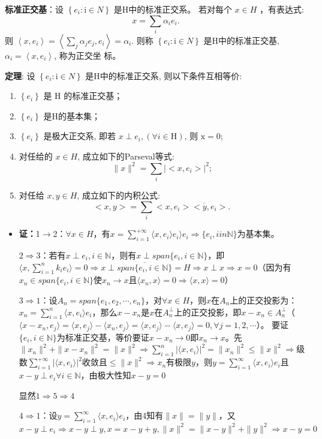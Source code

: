 \documentclass[12pt,a4paper]{article}
\begin{document}
\textbf{标准正交基}：设 $\left\{e_{i}: \mathrm{i} \in N\right\}$ 是H中的标准正交系。
若对每个 $x \in H$ ，有表达式:
$$
x=\sum_{i} \alpha_{i} e_{i} .
$$
则 $\left< x, e_{i}\right>=\left<\sum_{j} \alpha_{j} e_{j}, e_{i}\right>=\alpha_{i}$.
则称 $\left\{e_{i}: \mathrm{i} \in N\right\}$ 是H中的标准正交基, $\alpha_{i}=\left\langle x, e_{i}\right\rangle$, 称为正交坐 标。

\textbf{定理}: 设 $\left\{e_{i}: \mathrm{i} \in N\right\}$ 是H中的标准正交系, 则以下条件互相等价:
\begin{enumerate}
	\item $\left\{e_{i}\right\}$ 是 $\mathrm{H}$ 的标准正交基；
	\item $\left\{e_{i}\right\}$ 是H的基本集；
	\item $\left\{e_{i}\right\}$ 是极大正交系, 即若 $x \perp e_{i},(\forall i \in \mathrm{H})$, 则 $\mathrm{x}=0$;
	\item 对任给的 $x \in H$, 成立如下的Parseval等式:
$$
\|x\|^{2}=\sum_{i}\left|<x, e_{i}>\right|^{2} \text {; }
$$
\item 对任给 $x, y \in H$, 成立如下的内积公式:
$$
<x, y>=\sum_{i}<x, e_{i}>\overline{<y, e_{i}}>\text {. }
$$
\end{enumerate}
\begin{itemize}
	\item []
	\textbf{证：}1$\rightarrow$2：$\forall x\in H$，有$x=\sum_{i=1}^{+\infty}\langle x,e_i\rangle e_i \rangle e_i\Rightarrow \{e_i,i
	in \mathbb{N}\}$为基本集。
	
	$2\Rightarrow 3$：若有$x\perp e_i,i\in \mathbb{N}$，则有$x\perp span\{e_i,i \in \mathbb{N}\}$，即$\langle x,\sum_{i=1}^{n}k_ie_i\rangle =0\Rightarrow x\perp\overline{span\{e_i,i\in \mathbb{N}\}}=H\Rightarrow x\perp x\Rightarrow x=0$（因为有$x_n\in span\{e_i,i\in \mathbb{N}\}$使$x_n\rightarrow x$且$\langle x_n,x\rangle=0\Rightarrow\langle x,x\rangle=0$）
	
	$3\Rightarrow 1$：设$A_n=span\{e_1,e_2,\cdots,e_n\}$，对$\forall x\in H$，则$x$在$A_n$上的正交投影为：$x_n=\sum_{i=1}^n\langle x,e_i\rangle e_i$，那么$x-x_n$是$x$在$A_n^{\perp}$上的正交投影，即$x-x_n\in A_n^{\perp}$（$\langle x-x_n,e_j\rangle=\langle x,e_j\rangle -\langle x_n,e_j\rangle =\langle x,e_j\rangle-\langle x,e_j\rangle=0,\forall j=1,2,\cdots$）。
	要证$\{e_i,i\in \mathbb{N}\}$为标准正交基，等价要证$x-x_n\rightarrow 0$即$x_n\rightarrow x$。先$\|x_n\|^2+\|x-x_n\|^2=\|x\|^2\Rightarrow \sum_{i=1}^{n}|\langle x,e_i\rangle|^2=\|x_n\|^2\leqslant \|x\|^2\Rightarrow$级数$\sum_{i=1}^{+\infty}|\langle x,e_i\rangle|^2$收敛且$\leqslant\|x\|^2\Rightarrow x_n$有极限$y$，则$y=\sum_{i=1}^{\infty}\langle x,e_i\rangle e_i$且$x-y\perp e_i\forall i\in \mathbb{N}$，由极大性知$x-y=0$
	
	显然$1\Rightarrow 5\Rightarrow 4$
	
	$4\Rightarrow 1$：设$y=\sum_{i=1}^{\infty}\langle x,e_i\rangle e_i$，由4知有$\|x\|=\|y\|$，又$x-y\perp e_i\Rightarrow x-y\perp y,x=x-y+y,\|x\|^2=\|x-y\|^2+\|y\|^2\Rightarrow x-y=0$
\end{itemize} 
\end{document}
